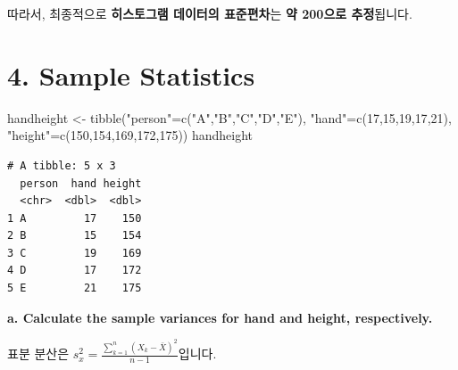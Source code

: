 \documentclass[
  a4paper,
  DIV=11,
  numbers=noendperiod]{scrreprt}
\newenvironment{Shaded}{\begin{snugshade}}{\end{snugshade}}
\newcommand{\DecValTok}[1]{\textcolor[rgb]{0.68,0.00,0.00}{#1}}
\newcommand{\FunctionTok}[1]{\textcolor[rgb]{0.28,0.35,0.67}{#1}}
\newcommand{\NormalTok}[1]{\textcolor[rgb]{0.00,0.23,0.31}{#1}}
\newcommand{\OtherTok}[1]{\textcolor[rgb]{0.00,0.23,0.31}{#1}}
\newcommand{\StringTok}[1]{\textcolor[rgb]{0.13,0.47,0.30}{#1}}
\begin{document}
따라서, 최종적으로 \textbf{히스토그램 데이터의 표준편차}는 \textbf{약
200으로 추정}됩니다.

\section*{4. Sample Statistics}\label{sample-statistics}


\begin{Shaded}
\begin{Highlighting}[]
\NormalTok{handheight }\OtherTok{\textless{}{-}} \FunctionTok{tibble}\NormalTok{(}\StringTok{"person"}\OtherTok{=}\FunctionTok{c}\NormalTok{(}\StringTok{"A"}\NormalTok{,}\StringTok{"B"}\NormalTok{,}\StringTok{"C"}\NormalTok{,}\StringTok{"D"}\NormalTok{,}\StringTok{"E"}\NormalTok{),}
                     \StringTok{"hand"}\OtherTok{=}\FunctionTok{c}\NormalTok{(}\DecValTok{17}\NormalTok{,}\DecValTok{15}\NormalTok{,}\DecValTok{19}\NormalTok{,}\DecValTok{17}\NormalTok{,}\DecValTok{21}\NormalTok{),}
                     \StringTok{"height"}\OtherTok{=}\FunctionTok{c}\NormalTok{(}\DecValTok{150}\NormalTok{,}\DecValTok{154}\NormalTok{,}\DecValTok{169}\NormalTok{,}\DecValTok{172}\NormalTok{,}\DecValTok{175}\NormalTok{))}
\NormalTok{handheight}
\end{Highlighting}
\end{Shaded}

\begin{verbatim}
# A tibble: 5 x 3
  person  hand height
  <chr>  <dbl>  <dbl>
1 A         17    150
2 B         15    154
3 C         19    169
4 D         17    172
5 E         21    175
\end{verbatim}

\textbf{a. Calculate the sample variances for hand and height,
respectively.}

표분 분산은 \(s_x^2=\frac{\sum_{k=1}^n(X_k-\bar{X})^2}{n-1}\)입니다.
\end{document}
